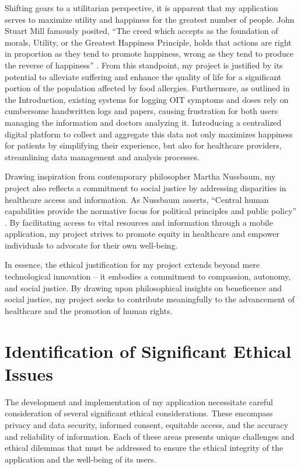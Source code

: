 Shifting gears to a utilitarian perspective, it is apparent that my application serves to maximize utility and happiness for the greatest number of people. John Stuart Mill famously posited, ``The creed which accepts as the foundation of morals, Utility, or the Greatest Happiness Principle, holds that actions are right in proportion as they tend to promote happiness, wrong as they tend to produce the reverse of happiness'' \cite{Mill}. From this standpoint, my project is justified by its potential to alleviate suffering and enhance the quality of life for a significant portion of the population affected by food allergies. Furthermore, as outlined in the Introduction, existing systems for logging OIT symptoms and doses rely on cumbersome handwritten logs and papers, causing frustration for both users managing the information and doctors analyzing it. Introducing a centralized digital platform to collect and aggregate this data not only maximizes happiness for patients by simplifying their experience, but also for healthcare providers, streamlining data management and analysis processes.

Drawing inspiration from contemporary philosopher Martha Nussbaum, my project also reflects a commitment to social justice by addressing disparities in healthcare access and information. As Nussbaum asserts, ``Central human capabilities provide the normative focus for political principles and public policy'' \cite{Nussbaum}. By facilitating access to vital resources and information through a mobile application, my project strives to promote equity in healthcare and empower individuals to advocate for their own well-being.

In essence, the ethical justification for my project extends beyond mere technological innovation – it embodies a commitment to compassion, autonomy, and social justice. By drawing upon philosophical insights on beneficence and social justice, my project seeks to contribute meaningfully to the advancement of healthcare and the promotion of human rights.

\section{Identification of Significant Ethical Issues}

The development and implementation of my application necessitate careful consideration of several significant ethical considerations. These encompass privacy and data security, informed consent, equitable access, and the accuracy and reliability of information. Each of these areas presents unique challenges and ethical dilemmas that must be addressed to ensure the ethical integrity of the application and the well-being of its users.

